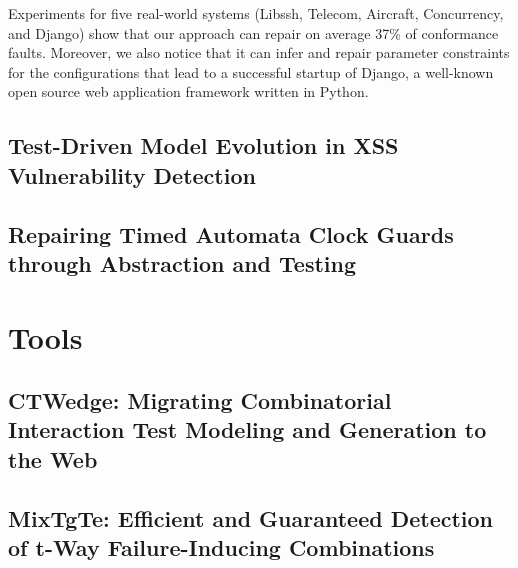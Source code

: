 \documentclass[
11pt, %
oneside, %
english, %
singlespacing, %
headsepline, %
]{MastersDoctoralThesis} %
\theoremstyle{plain}
\theoremstyle{definition}
\theoremstyle{remark}
\theoremstyle{remark}
\theoremstyle{plain}
\theoremstyle{plain}
\begin{document}
Experiments for five real-world systems (Libssh, Telecom, Aircraft, Concurrency, and Django) show that our approach can repair on average 37\% of conformance faults. Moreover, we also notice that it can infer and repair parameter constraints for the configurations that lead to a successful startup of Django, a well-known open source web application framework written in Python.



\section{Test-Driven Model Evolution in XSS Vulnerability Detection}
\section{Repairing Timed Automata Clock Guards through Abstraction and Testing}


\chapter{Tools}
\section{CTWedge: Migrating Combinatorial Interaction Test Modeling and Generation to the Web}
\section{MixTgTe: Efficient and Guaranteed Detection of t-Way Failure-Inducing Combinations}
\end{document}

